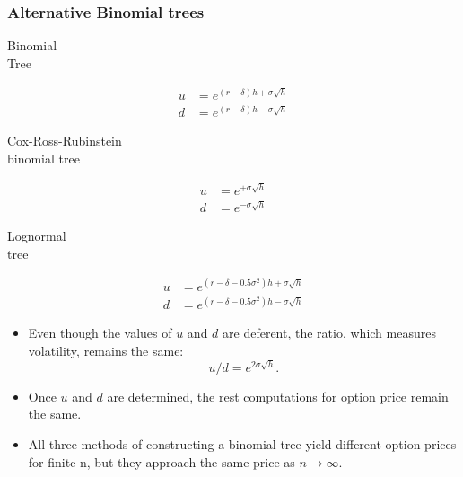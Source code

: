 \begin{frame}[fragile]
	\frametitle{Alternative Binomial trees}

	\begin{minipage}{0.3\textwidth}
		\begin{center}
		Binomial\\
		Tree

		\begin{align*}
			u & =e^{(r-\delta)h + \sigma \sqrt{h}} \\
			d & =e^{(r-\delta)h - \sigma \sqrt{h}}
		\end{align*}
		\end{center}
	\end{minipage}
	\hfill
	\begin{minipage}{0.3\textwidth}
		\begin{center}
		Cox-Ross-Rubinstein\\
		binomial tree

		\begin{align*}
			u & =e^{ + \sigma \sqrt{h}} \\
			d & =e^{ - \sigma \sqrt{h}}
		\end{align*}
		\end{center}
	\end{minipage}
	\hfill
	\begin{minipage}{0.3\textwidth}
		\begin{center}
		 Lognormal \\ tree

		\begin{align*}
			u & =e^{(r-\delta-0.5\sigma^2)h + \sigma \sqrt{h}} \\
			d & =e^{(r-\delta-0.5\sigma^2)h - \sigma \sqrt{h}}
		\end{align*}
		\end{center}
	\end{minipage}
	\pause
	\bigskip
	\mySeparateLine
	\bigskip
	\begin{itemize}
		\item Even though the values of $u$ and $d$ are deferent, the ratio, which measures volatility,
			remains the same:
			\begin{equation*}
				u/d = e^{2\sigma \sqrt{h}}.
			\end{equation*}
		\item Once $u$ and $d$ are determined, the rest computations for option price remain the same.
		\item All three methods of constructing a binomial tree yield different option prices for finite
			n, but they approach the same price as $n\to\infty$.
	\end{itemize}
\end{frame}
